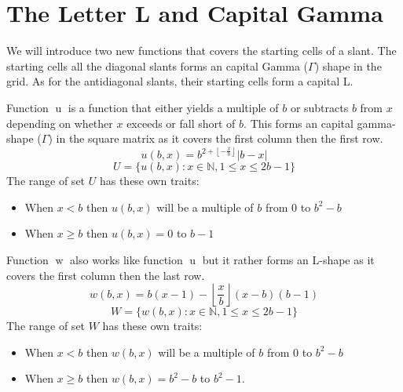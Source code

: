 \documentclass[twoside,openany,12pt]{book}
\begin{document}
    \section{The Letter L and Capital Gamma} \label{u_and_w}
    We will introduce two new functions that covers the starting cells of a slant. The starting cells all the diagonal slants forms an capital Gamma ($\Gamma$) shape in the grid. As for the antidiagonal slants, their starting cells form a capital L.


    Function $\operatorname{u}$ is a function that either yields a multiple of $b$ or subtracts $b$ from $x$ depending on whether $x$ exceeds or fall short of $b$. This forms an capital gamma-shape ($\Gamma$) in the square matrix as it covers the first column then the first row.
    \begin{equation*}
        u(b,x) = b^{2 + \left\lfloor -\frac{x}{b} \right\rfloor }|b-x|
    \end{equation*}
    \begin{equation*}
        U = \{ u(b,x) : x \in \mathbb{N}, 1 \leq x \leq 2b - 1 \}
    \end{equation*}
    The range of set $U$ has these own traits:
    \begin{itemize}
        \item When $x < b$ then $u(b,x)$ will be a multiple of $b$ from $0$ to $b^2-b$
        \item When $x \geq b$ then $u(b,x) = 0$ to $b-1$
    \end{itemize}

    Function $\operatorname{w}$ also works like function $\operatorname{u}$ but it rather forms an L-shape as it covers the first column then the last row.
    \begin{equation*}
      w(b,x) = b(x - 1) - \left\lfloor \frac{x}{b} \right\rfloor(x - b)(b - 1)
    \end{equation*}
    \begin{equation*}
        W = \{ w(b,x) : x \in \mathbb{N}, 1 \leq x \leq 2b - 1 \}
    \end{equation*}
    The range of set $W$ has these own traits:
    \begin{itemize}
        \item When $x < b$ then $w(b,x)$ will be a multiple of $b$ from $0$ to $b^2-b$
        \item When $x \geq b$ then $w(b,x) = b^2 - b$ to $b^2 - 1$.
    \end{itemize}
\end{document}
